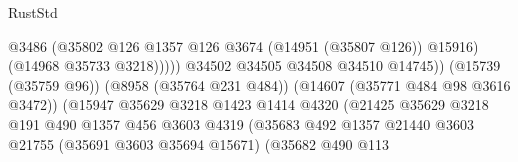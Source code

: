 \begin{lexlean}{RustStd}
\begin{coremodule}
                                                            @3486
                                                            (@35802
                                                              @126
                                                              @1357
                                                              @126
                                                              @3674
                                                              (@14951 (@35807 @126))
                                                              @15916)
                                                            (@14968 @35733 @3218)))))
                                                    @34502
                                                    @34505
                                                    @34508
                                                    @34510
                                                    @14745))
                                                (@15739 (@35759 @96))
                                                (@8958 (@35764 @231 @484))
                                                (@14607 (@35771 @484 @98 @3616 @3472))
                                                (@15947
                                                  @35629
                                                  @3218
                                                  @1423
                                                  @1414
                                                  @4320
                                                  (@21425
                                                    @35629
                                                    @3218
                                                    @191
                                                    @490
                                                    @1357
                                                    @456
                                                    @3603
                                                    @4319
                                                    (@35683
                                                      @492
                                                      @1357
                                                      @21440
                                                      @3603
                                                      @21755
                                                      (@35691 @3603 @35694 @15671)
                                                      (@35682
                                                        @490
                                                        @113

\end{coremodule}
\end{lexlean}
